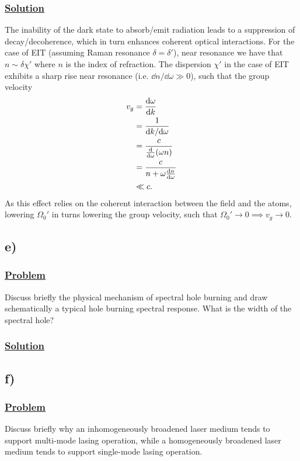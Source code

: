 \documentclass[12pt]{article}
\begin{document}
\subsubsection*{\underline{Solution}}
The inability of the dark state to absorb/emit radiation leads to a suppression of decay/decoherence, which in turn enhances coherent optical interactions.
For the case of EIT (assuming Raman resonance $\delta = \delta'$), near resonance we have that $n \sim \delta \chi'$ where $n$ is the index of refraction.
The dispersion $\chi'$ in the case of EIT exhibits a sharp rise near resonance (i.e. $\dd n/\dd\omega \gg 0$), such that the group velocity
\begin{align*}
    v_g &= \dv{\omega}{k} \\
    &= \frac{1}{\dd k/\dd\omega} \\
    &= \frac{c}{\dv{\omega}(\omega n)} \\
    &= \frac{c}{n + \omega\dv{n}{\omega}} \\
    &\ll c.
\end{align*}
As this effect relies on the coherent interaction between the field and the atoms, lowering $\Omega_0'$ in turns lowering the group velocity, such that $\Omega_0' \to 0 \implies v_g \to 0$.

\subsection*{e)}
\subsubsection*{\underline{Problem}}
Discuss briefly the physical mechanism of spectral hole burning and draw schematically a typical hole burning spectral response.
What is the width of the spectral hole?

\subsubsection*{\underline{Solution}}


\subsection*{f)}
\subsubsection*{\underline{Problem}}
Discuss briefly why an inhomogeneously broadened laser medium tends to support multi-mode lasing operation, while a homogeneously broadened laser medium tends to support single-mode lasing operation.
\end{document}
